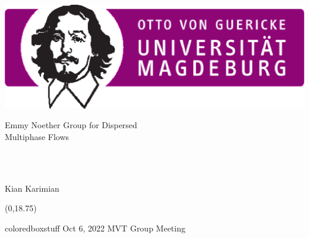 \documentclass[10pt,xcolor=dvipsnames]{beamer}
\begin{document}

\begin{frame}[t]

\includegraphics[width=0.3\columnwidth]{fig/ovgu-crop_fvst.eps}\qquad
\parbox[b][1cm][t]{0.6\columnwidth}{Emmy Noether Group for Dispersed\\Multiphase Flows}\hfill\mbox{}\\
\begin{center}
 \\[0\baselineskip]
Kian Karimian\\[0.5\baselineskip]
\end{center}

\begin{textblock}{20}(0,18.75)
\begin{beamercolorbox}[wd=\paperwidth,sep=0.5em]{coloredboxstuff}
\small Oct 6, 2022 \hfill MVT Group Meeting \\\mbox{}
\end{beamercolorbox}
\end{textblock}

\end{frame}



\end{document}

